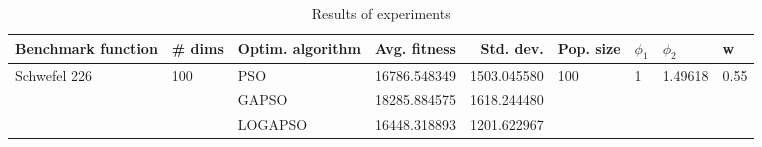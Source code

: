 \begin{table}
\centering
\caption{Results of experiments}
\begin{tabular}{lllrrllll}
\toprule
           Benchmark function &              \# dims & Optim. algorithm &  Avg. fitness &   Std. dev. &            Pop. size &         $\phi_{1}$ &               $\phi_{2}$ &                     w \\
\midrule
\multirow{3}{*}{Schwefel 226} & \multirow{3}{*}{100} &              PSO &  16786.548349 & 1503.045580 & \multirow{3}{*}{100} & \multirow{3}{*}{1} & \multirow{3}{*}{1.49618} & \multirow{3}{*}{0.55} \\
                              &                      &            GAPSO &  18285.884575 & 1618.244480 &                      &                    &                          &                       \\
                              &                      &          LOGAPSO &  16448.318893 & 1201.622967 &                      &                    &                          &                       \\
\bottomrule
\end{tabular}
\end{table}
